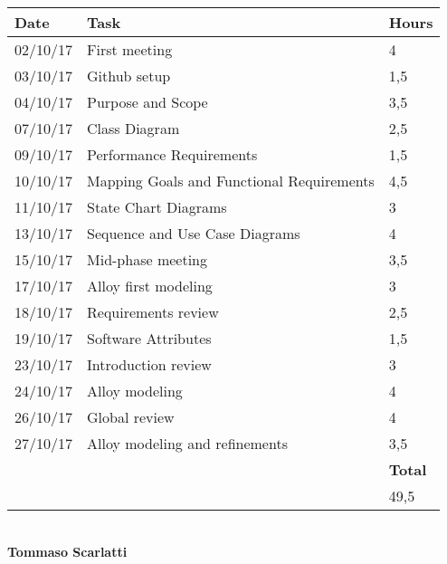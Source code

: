 \begin{tabular}{| l | l | l |}
	\hline
	\textbf{Date} & \textbf{Task} & \textbf{Hours}\\
	\hline
	02/10/17 & First meeting & 4\\
	03/10/17 & Github setup & 1,5\\
	04/10/17 & Purpose and Scope & 3,5 \\
	07/10/17 & Class Diagram & 2,5 \\
	09/10/17 & Performance Requirements & 1,5\\
	10/10/17 & Mapping Goals and Functional Requirements & 4,5 \\
	11/10/17 & State Chart Diagrams & 3 \\
	13/10/17 & Sequence and Use Case Diagrams & 4\\
	15/10/17 & Mid-phase meeting & 3,5 \\
	17/10/17 & Alloy first modeling & 3 \\
	18/10/17 & Requirements review & 2,5 \\
	19/10/17 & Software Attributes & 1,5 \\
	23/10/17 & Introduction review & 3 \\
	24/10/17 & Alloy modeling & 4\\
	26/10/17 & Global review & 4 \\
	27/10/17 & Alloy modeling and refinements & 3,5\\
	\hline
	& & \textbf{Total}\\
	\hline
	& & 49,5\\	
	\hline

\end{tabular}\\

\newpage
\noindent
\textbf{Tommaso Scarlatti}\\

